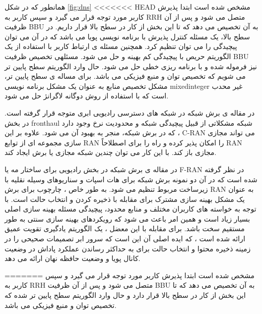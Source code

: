 همانطور که در شکل \eqref{fig:dns} 
<<<<<<< HEAD
مشخص شده است ابتدا پذیرش کاربر مورد توجه قرار می گیرد و سپس کاربر به RRH متصل می شود و پس از آن ظرفیت BBU به آن تخصیص می دهد که تا این بخش از کار در سطح بالا قرار داریم.
در سطح بالا، یک مسئله کنترل پذیرش با برنامه نویسی پویا می باشد که در آن می توان پیچیدگی را می توان تنظیم کرد.
همچنین مسئله ی ارتباط کاربر با استفاده از یک الگوریتم حریص با پیچیدگی کم بهینه و حل می شود.
 مسئلهی تخصیص ظرفیت BBU نیز فرموله شده و با برنامه ریزی خطی حل می شود.
 حال وارد الگوریتم سطح پایین تر می شویم که تخصیص توان و منبع فیزیکی می باشد.
برای مساله ی سطح پایین تر، مشکل تخصیص منابع به عنوان یک مشکل برنامه نویسی mixedinteger غیر محدب است که با استفاده از روش دوگانه لاگرانژ حل می شود.


در مقاله ی 
\cite{larsen2018fronthaul,costanzo2018network}
برش شبکه در شبکه های دسترسی رادیویی ابری متوجه قرار گرفته است. 
در بخش fronthaul شبکه مشکلاتی از قبیل پیچیدگی شبکه و محدودیت نرخ وجود دارد که در برش شبکه، منجر به بهبود آن می شود.
علاوه بر این ، C-RAN می تواند مجازی سازی مجموعه ای از توابع RAN را امکان پذیر کرده و راه را برای اصطلاحاً RAN مجازی باز کند. با این کار می توان چندین شبکه مجازی یا برش ایجاد کند.


در مقاله ی 
\cite{fran}
برش شبکه در بخش رادیویی برای ساختار مه 
 یا F-RAN
  در نظر گرفته شده است که در آن دو نمونه برش شبکه برای هات اسپات و سناریوهای وسیله نقلیه با زیرساخت مربوط تنظیم می شود. به طور خاص ، چارچوب برای برش RAN به عنوان یک مشکل بهینه سازی مشترک برای مقابله با ذخیره کردن و انتخاب حالت است.
  با توجه به خواسته های کاربران مختلف و منابع محدود، پیچیدگی مسئله بهینه سازی اصلی بسیار زیاد است و همین امر باعث می شود که رویکردهای بهینه سازی سنتی به طور مستقیم سخت باشد.
 برای مقابله با این معضل ، یک الگوریتم یادگیری تقویت عمیق ارائه شده است ، که ایده اصلی آن این است که سرور ابر تصمیمات صحیحی را در زمینه ذخیره محتوا و انتخاب حالت برای به حداکثر رساندن عملکرد پاداش در وضعیت کانال پویا و وضعیت حافظه نهان ارائه می دهد.
 
=======
مشخص شده است ابتدا پذیرش کاربر مورد توجه قرار می گیرد و سپس کاربر به RRH متصل می شود و پس از آن ظرفیت BBU به آن تخصیص می دهد که تا این بخش از کار در سطح بالا قرار دارد و حال وارد الگوریتم سطح پایین تر شده که تخصیص توان و منبع فیزیکی می باشد.

